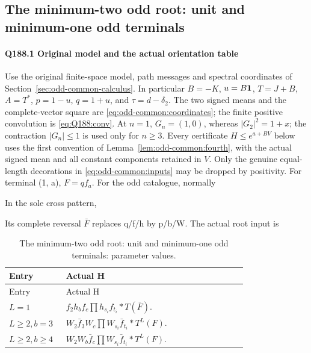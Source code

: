 \subsection{The minimum-two odd root: unit and minimum-one odd terminals}\label{proof:Q5-C188}
\paragraph{Q188.1 Original model and the actual orientation table}

Use the original finite-space model, path messages and spectral coordinates
of Section~\ref{sec:odd-common-calculus}. In particular
\(B=-K\), \(u=B\mathbf1\), \(T=J+B\), \(A=T^*\),
\(p=1-u\), \(q=1+u\), and \(\tau=d-\delta_2\).
The two signed means and the complete-vector square are
\eqref{eq:odd-common:coordinates}; the finite positive convolution is
\eqref{eq:Q188:conv}. At \(n=1\), \(G_n=(1,0)\), whereas
\(|G_2|^2=1+x\); the contraction \(|G_n|\le1\) is used only for
\(n\ge3\).
Every certificate \(H\le e^{a+BV}\) below uses the first convention
of Lemma~\ref{lem:odd-common:fourth}, with the actual signed mean and
all constant components retained in \(V\).
Only the genuine equal-length decorations in
\eqref{eq:odd-common:inputs} may be dropped by positivity.
For terminal (1, a), \(F=q f_a.\) For the odd catalogue, normally



In the sole cross pattern,



Its complete reversal \(\bar F\) replaces q/f/h by p/b/W. The actual root input is


\begingroup\small
\setlength{\tabcolsep}{3pt}
\setlength{\LTleft}{0pt}\setlength{\LTright}{\fill}
\begin{longtable}{@{}p{0.2200\linewidth}p{0.7000\linewidth}@{}}
\caption{The minimum-two odd root: unit and minimum-one odd terminals: parameter values.}\label{tab:parameters:q5-c188:1}\\
\toprule
Entry & Actual H \\
\midrule\endfirsthead
\toprule
Entry & Actual H \\
\midrule\endhead
\bottomrule\endfoot
\(L=1\) & \(f_2 h_b f_c \prod h_{s_i} f_{t_i} * T(\bar F)\). \\
\addlinespace[2pt]
\(L\ge 2,\allowbreak \allowbreak  b=3\) & \(W_2 \bar f_3 W_c \prod W_{s_i} \bar f_{t_i} * T^L(F)\). \\
\addlinespace[2pt]
\(L\ge 2,\allowbreak \allowbreak  b\ge 4\) & \(W_2 W_b \bar f_c \prod W_{s_i} \bar f_{t_i} * T^L(F)\). \\
\end{longtable}
\endgroup


